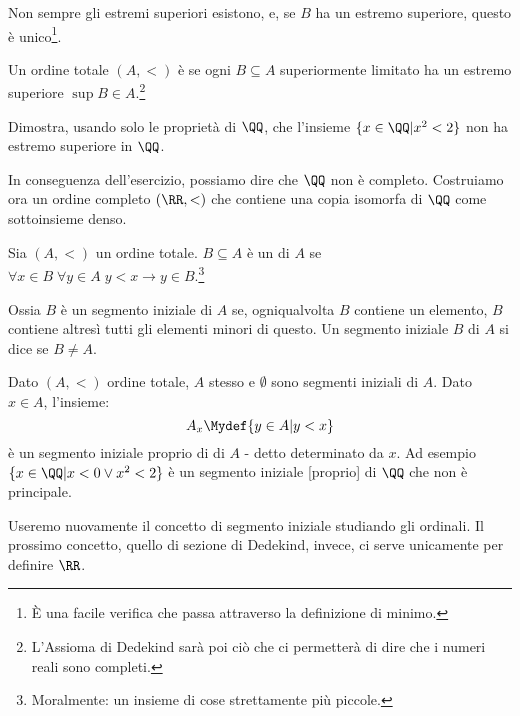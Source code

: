 \documentclass[11pt]{scrartcl}
\begin{document}
\begin{note}
	Non sempre gli estremi superiori esistono, e, se $B$ ha un estremo superiore, questo è unico\footnote{È una facile verifica che passa attraverso la definizione di minimo.}.
\end{note}

\begin{definition}
	Un ordine totale $(A,<)$ è  se ogni $B \subseteq A$ superiormente limitato ha un estremo superiore $\sup B \in A$.\footnote{L'Assioma di Dedekind sarà poi ciò che ci permetterà di dire che i numeri reali sono completi.}
\end{definition}

\begin{exercise}
	Dimostra, usando solo le proprietà di $\QQ$, che l'insieme $\{x \in \QQ | x^2 < 2\}$ non ha estremo superiore in $\QQ$.
\end{exercise}

In conseguenza dell'esercizio, possiamo dire che $\QQ$ non è completo. Costruiamo ora un ordine completo $(\RR,<)$ che contiene una copia isomorfa di $\QQ$ come sottoinsieme denso.

\begin{definition}
	Sia $(A,<)$ un ordine totale. $B \subseteq A$ è un  di $A$ se $\forall x \in B \; \forall y \in A \; y < x \rightarrow y \in B$.\footnote{Moralmente: un insieme di cose strettamente più piccole.}
\end{definition}

Ossia $B$ è un segmento iniziale di $A$ se, ogniqualvolta $B$ contiene un elemento, $B$ contiene altresì tutti gli elementi minori di questo.
Un segmento iniziale $B$ di $A$ si dice  se $B \ne A$.

\begin{example}
	Dato $(A,<)$ ordine totale, $A$ stesso e $\emptyset$ sono segmenti iniziali di $A$. Dato $x \in A$, l'insieme:
	\[ A_x \Mydef \{y \in A | y < x\}
		\]
	è un segmento iniziale proprio di di $A$ - detto  determinato da $x$. Ad esempio $\{x \in \QQ | x < 0 \lor x^2 < 2\}$
	è un segmento iniziale [proprio] di $\QQ$ che non è principale.
\end{example}

\begin{note}
	Useremo nuovamente il concetto di segmento iniziale studiando gli ordinali. Il prossimo concetto, quello di sezione di Dedekind, invece, ci serve unicamente per definire $\RR$.
\end{note}
\end{document}
